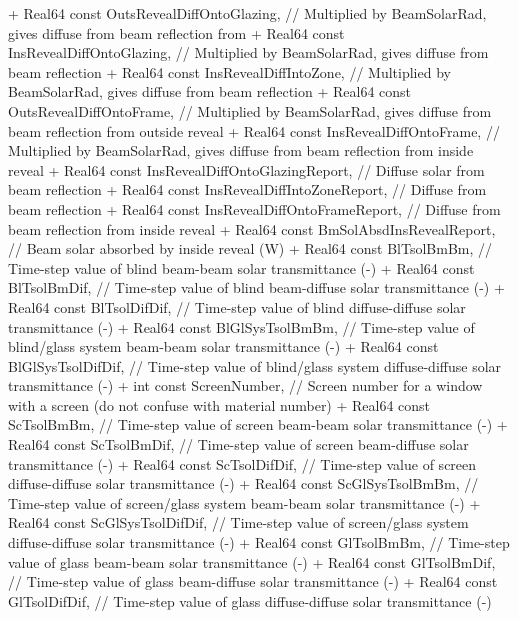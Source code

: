 \begin{DoxyCode}
+           Real64 const OutsRevealDiffOntoGlazing, // Multiplied by BeamSolarRad, gives diffuse from beam
       reflection from
+           Real64 const InsRevealDiffOntoGlazing, // Multiplied by BeamSolarRad, gives diffuse from beam
       reflection
+           Real64 const InsRevealDiffIntoZone, // Multiplied by BeamSolarRad, gives diffuse from beam
       reflection
+           Real64 const OutsRevealDiffOntoFrame, // Multiplied by BeamSolarRad, gives diffuse from beam
       reflection from outside reveal
+           Real64 const InsRevealDiffOntoFrame, // Multiplied by BeamSolarRad, gives diffuse from beam
       reflection from inside reveal
+           Real64 const InsRevealDiffOntoGlazingReport, // Diffuse solar from beam reflection
+           Real64 const InsRevealDiffIntoZoneReport, // Diffuse from beam reflection
+           Real64 const InsRevealDiffOntoFrameReport, // Diffuse from beam reflection from inside reveal
+           Real64 const BmSolAbsdInsRevealReport, // Beam solar absorbed by inside reveal (W)
+           Real64 const BlTsolBmBm, // Time-step value of blind beam-beam solar transmittance (-)
+           Real64 const BlTsolBmDif, // Time-step value of blind beam-diffuse solar transmittance (-)
+           Real64 const BlTsolDifDif, // Time-step value of blind diffuse-diffuse solar transmittance (-)
+           Real64 const BlGlSysTsolBmBm, // Time-step value of blind/glass system beam-beam solar
       transmittance (-)
+           Real64 const BlGlSysTsolDifDif, // Time-step value of blind/glass system diffuse-diffuse solar
       transmittance (-)
+           int const ScreenNumber, // Screen number for a window with a screen (do not confuse with
       material number)
+           Real64 const ScTsolBmBm, // Time-step value of screen beam-beam solar transmittance (-)
+           Real64 const ScTsolBmDif, // Time-step value of screen beam-diffuse solar transmittance (-)
+           Real64 const ScTsolDifDif, // Time-step value of screen diffuse-diffuse solar transmittance (-)
+           Real64 const ScGlSysTsolBmBm, // Time-step value of screen/glass system beam-beam solar
       transmittance (-)
+           Real64 const ScGlSysTsolDifDif, // Time-step value of screen/glass system diffuse-diffuse solar
       transmittance (-)
+           Real64 const GlTsolBmBm, // Time-step value of glass beam-beam solar transmittance (-)
+           Real64 const GlTsolBmDif, // Time-step value of glass beam-diffuse solar transmittance (-)
+           Real64 const GlTsolDifDif, // Time-step value of glass diffuse-diffuse solar transmittance (-)

\end{DoxyCode}
